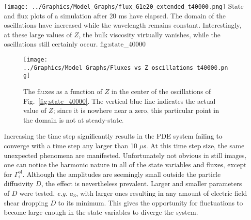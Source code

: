 	{\texttt{[image: ../Graphics/Model\_Graphs/flux\_G1e20\_extended\_t40000.png]}}
	{State and flux plots of a simulation after 20 ms have elapsed.
	The domain of the oscillations have increased while the wavelength remains constant.
	Interestingly, at these large values of $Z$, the bulk viscosity virtually vanishes, while the oscillations still certainly occur.}
	{fig:state_40000}

\begin{figure}[tb] %
	\centering
	\texttt{[image: ../Graphics/Model\_Graphs/Fluxes\_vs\_Z\_oscillations\_t40000.png]}
	\caption{The fluxes as a function of $Z$ in the center of the oscillations of Fig.~\ref{fig:state_40000}.
	The vertical blue line indicates the actual value of $Z$; since it is nowhere near a zero, this particular point in the domain is not at steady-state.}
	\label{fig:fluxes_steady-state_40000}
\end{figure}

Increasing the time step significantly results in the PDE system failing to converge with a time step any larger than 10 $\mu$s.
At this time step size, the same unexpected phenomena are manifested.
Unfortunately not obvious in still images, one can notice the harmonic nature in all of the state variables and fluxes, except for $\Gamma_i^\text{ol}$.
Although the amplitudes are seemingly small outside the particle diffusivity $D$, the effect is nevertheless prevalent.
Larger and smaller parameters of $D$ were tested, \emph{e.g.} $a_3$, with larger ones resulting in any amount of electric field shear dropping $D$ to its minimum.
This gives the opportunity for fluctuations to become large enough in the state variables to diverge the system.

